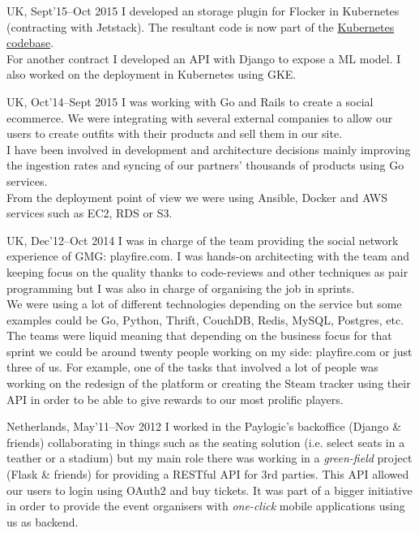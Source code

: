 \documentclass[11pt, a4paper, sans]{moderncv}
\begin{document}
{UK, Sept'15--Oct 2015}
{I developed an storage plugin for Flocker in Kubernetes (contracting with Jetstack). The resultant code is now part of the \href{https://github.com/kubernetes/kubernetes/pull/14328}{Kubernetes codebase}.\\
For another contract I developed an API with Django to expose a ML model. I also worked on the deployment in Kubernetes using GKE.\\}

{UK, Oct'14--Sept 2015}
{I was working with Go and Rails to create a social ecommerce. We were integrating with several external companies to allow our users to create outfits with their products and sell them in our site.\\
I have been involved in development and architecture decisions mainly improving the ingestion rates and syncing of our partners' thousands of products using Go services.\\
From the deployment point of view we were using Ansible, Docker and AWS services such as EC2, RDS or S3.\\}

{UK, Dec'12--Oct 2014}
{I was in charge of the team providing the social network experience of GMG: playfire.com. I was hands-on architecting with the team and keeping focus on the quality thanks to code-reviews and other techniques as pair programming but I was also in charge of organising the job in sprints.\\
We were using a lot of different technologies depending on the service but some examples could be Go, Python, Thrift, CouchDB, Redis, MySQL, Postgres, etc.\\
The teams were liquid meaning that depending on the business focus for that sprint we could be around twenty people working on my side: playfire.com or just three of us.
For example, one of the tasks that involved a lot of people was working on the redesign of the platform or creating the Steam tracker using their API in order to be able to give rewards to our most prolific players.\\}

{Netherlands, May'11--Nov 2012}
{I worked in the Paylogic's backoffice (Django \& friends) collaborating in things such as the seating solution (i.e. select seats in a teather or a stadium) but my main role there was working in a \textit{green-field} project (Flask \& friends) for providing a RESTful API for 3rd parties.
This API allowed our users to login using OAuth2 and buy tickets. It was part of a bigger initiative in order to provide the event organisers with \textit{one-click} mobile applications using us as backend.\\}
\end{document}
